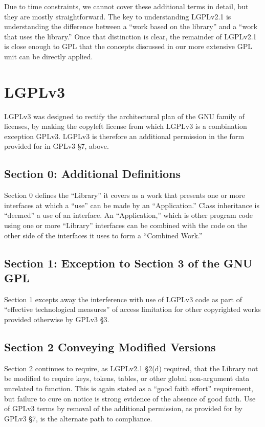 Due to time constraints, we cannot cover these additional terms in detail,
but they are mostly straightforward. The key to understanding LGPLv2.1 is
understanding the difference between a ``work based on the library'' and a
``work that uses the library.''  Once that distinction is clear, the
remainder of LGPLv2.1 is close enough to GPL that the concepts discussed in
our more extensive GPL unit can be directly applied.


\chapter{LGPLv3}

LGPLv3 was designed to rectify the architectural plan of the GNU family of
licenses, by making the copyleft license from which LGPLv3 is a combination
exception GPLv3. LGPLv3 is therefore an additional permission in the form
provided for in GPLv3 \S7, above.

\section{Section 0: Additional Definitions}

Section 0 defines the ``Library'' it covers as a work that presents one or more
interfaces at which a ``use'' can be made by an ``Application.'' Class
inheritance is ``deemed'' a use of an interface. An ``Application,'' which is
other program code using one or more ``Library'' interfaces can be combined
with the code on the other side of the interfaces it uses to form a ``Combined
Work.''

\section{Section 1: Exception to Section 3 of the GNU GPL}

Section 1 excepts away the interference with use of LGPLv3 code as part of
``effective technological measures'' of access limitation for other copyrighted
works provided otherwise by GPLv3 \S3.


\section{Section 2 Conveying Modified Versions}

Section 2 continues to require, as LGPLv2.1 \S2(d) required, that the Library
not be modified to require keys, tokens, tables, or other global non-argument
data unrelated to function. This is again stated as a ``good faith effort''
requirement, but failure to cure on notice is strong evidence of the absence
of good faith. Use of GPLv3 terms by removal of the additional permission, as
provided for by GPLv3 \S7, is the alternate path to compliance.

